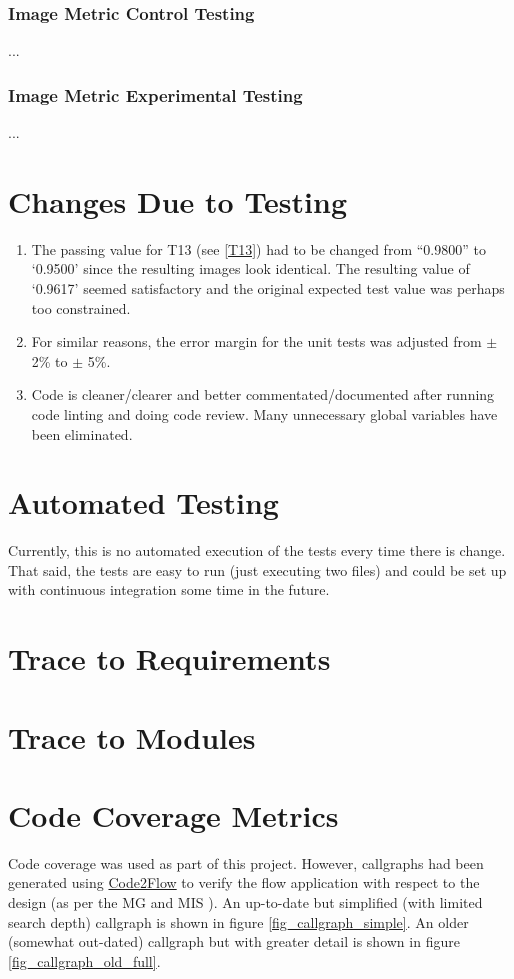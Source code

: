 \documentclass[12pt, titlepage]{article}
\begin{document}
\subsubsection{Image Metric Control Testing}
...
\subsubsection{Image Metric Experimental Testing}
...

\section{Changes Due to Testing}
\begin{enumerate}
  \item The passing value for T13 (see \ref{T13}) had to be changed from ``0.9800'' to `0.9500' since the
    resulting images look identical. The resulting value of `0.9617' seemed satisfactory and the original
    expected test value was perhaps too constrained.
  \item For similar reasons, the error margin for the unit tests was adjusted from $\pm$ 2\% to $\pm$ 5\%.
  \item Code is cleaner/clearer and better commentated/documented after running code linting and
    doing code review. Many unnecessary global variables have been eliminated.
\end{enumerate}


\section{Automated Testing}
Currently, this is no automated execution of the tests every time there is change.
That said, the tests are easy to run (just executing two files) and could be set up with
continuous integration some time in the future.

\section{Trace to Requirements}
		
\section{Trace to Modules}		

\section{Code Coverage Metrics}
Code coverage was used as part of this project. However, callgraphs had been generated using
\href{https://github.com/scottrogowski/code2flow}{Code2Flow}
to verify the flow application with respect to the design (as per the MG \cite{MG} and MIS \cite{MIS}).
An up-to-date but simplified (with limited search depth) callgraph is shown in figure \ref{fig_callgraph_simple}.
An older (somewhat out-dated) callgraph but with greater detail is shown in figure \ref{fig_callgraph_old_full}.
\end{document}
